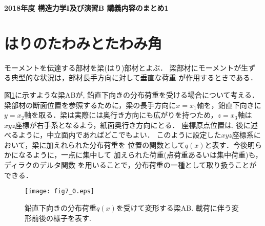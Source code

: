 \documentclass[10pt,a4j]{jarticle}
\newlength{\minitwocolumn}
\begin{document}
\newcommand{\fat}[1]{\mbox{\boldmath $#1$}}
\newcommand{\D}{\partial}
\newcommand{\w}{\omega}
\newcommand{\ga}{\alpha}
\newcommand{\gb}{\beta}
\newcommand{\gx}{\xi}
\newcommand{\gz}{\zeta}
\newcommand{\vhat}[1]{\hat{\fat{#1}}}
\newcommand{\spc}{\vspace{0.7\baselineskip}}
\newcommand{\halfspc}{\vspace{0.3\baselineskip}}

\newcommand{\twofig}[2]
 {
   \begin{figure}
     \begin{minipage}[t]{\minitwocolumn}
         \begin{center}   #1
         \end{center}
     \end{minipage}
         \hspace{\columnsep}
     \begin{minipage}[t]{\minitwocolumn}
         \begin{center} #2
         \end{center}
     \end{minipage}
   \end{figure}
 }
\begin{center}
	{\Large \bf 2018年度 構造力学I及び演習B 講義内容のまとめ1} \\
\end{center}
\section{はりのたわみとたわみ角}
モーメントを伝達する部材を梁(はり)部材とよぶ．
梁部材にモーメントが生ずる典型的な状況は，部材長手方向に対して垂直な荷重
が作用するときである．

図\ref{fig:fig7_0}に示すような梁ABが, 鉛直下向きの分布荷重を受ける場合について考える．
梁部材の断面位置を参照するために，梁の長手方向に$x=x_1$軸を，鉛直下向きに
$y=x_2$軸を取る．梁は実際には奥行き方向にも広がりを持つため，$z=x_3$軸は
$xyz$座標が右手系となるよう，紙面奥行き方向にとる．
座標原点位置は, 後に述べるように，中立面内であればどこでもよい．
このように設定した$xyz$座標系において，梁に加えれられた分布荷重を
位置の関数として$q(x)$と表す．今後明らかになるように，一点に集中して
加えられた荷重(点荷重あるいは集中荷重)も，ディラクのデルタ関数
を用いることで，分布荷重の一種として取り扱うことができる．
\begin{figure}[h]
	\begin{center}
	\texttt{[image: fig7\_0.eps]} 
	\end{center}
	\caption{
		鉛直下向きの分布荷重$q(x)$を受けて変形する梁AB.
		載荷に伴う変形前後の様子を表す. 
	} 
	\label{fig:fig7_0}
\end{figure}
\end{document}

